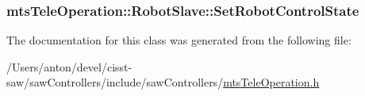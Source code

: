 \subsubsection[{Set\+Robot\+Control\+State}]{ mts\+Tele\+Operation\+::\+Robot\+Slave\+::\+Set\+Robot\+Control\+State}\label{classmts_tele_operation_1_1_robot_slave_a7d66a6da265a36a7f88492030adb29af}


The documentation for this class was generated from the following file\+:\begin{DoxyCompactItemize}
\item 
/\+Users/anton/devel/cisst-\/saw/saw\+Controllers/include/saw\+Controllers/\hyperlink{mts_tele_operation_8h}{mts\+Tele\+Operation.\+h}\end{DoxyCompactItemize}
